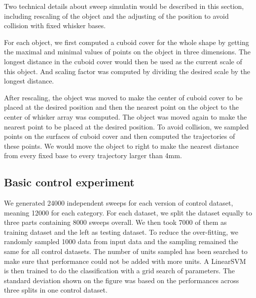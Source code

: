 Two technical details about sweep simulatin would be described in this section, including rescaling of the object and the adjusting of the position to avoid collision with fixed whisker bases.

For each object, we first computed a cuboid cover for the whole shape by getting the maximal and minimal values of points on the object in three dimensions.
The longest distance in the cuboid cover would then be used as the current scale of this object.
And scaling factor was computed by dividing the desired scale by the longest distance.

After rescaling, the object was moved to make the center of cuboid cover to be placed at the desired position and then the nearest point on the object to the center of whisker array was computed.
The object was moved again to make the nearest point to be placed at the desired position.
To avoid collision, we sampled points on the surfaces of cuboid cover and then computed the trajectories of these points.
We would move the object to right to make the nearest distance from every fixed base to every trajectory larger than 4mm.

\subsection{Basic control experiment}

We generated 24000 independent sweeps for each version of control dataset, meaning 12000 for each category. 
For each dataset, we split the dataset equally to three parts containing 8000 sweeps overall. 
We then took 7000 of them as training dataset and the left as testing dataset.
To reduce the over-fitting, we randomly sampled 1000 data from input data and the sampling remained the same for all control datasets.
The number of units sampled has been searched to make sure that performance could not be added with more units.
A LinearSVM is then trained to do the classification with a grid search of parameters.
The standard deviation shown on the figure was based on the performances across three splits in one control dataset.